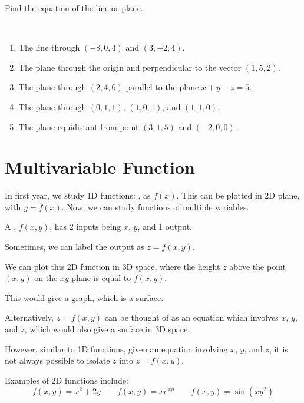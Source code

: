 \documentclass[11pt,fleqn]{book} %
\begin{document}
\begin{exercise}
    Find the equation of the line or plane.

    {~~~}

    \begin{enumerate}
        \item The line through $(-8, 0, 4)$ and $(3, -2, 4)$.
        \item The plane through the origin and perpendicular to the vector $(1, 5, 2)$.
        \item The plane through $(2, 4, 6)$ parallel to the plane $x + y - z = 5$.
        \item The plane through $(0, 1, 1)$, $(1, 0, 1)$, and $(1, 1, 0)$.
        \item The plane equidistant from point $(3, 1, 5)$ and $(-2, 0, 0)$.
    \end{enumerate}
\end{exercise}

\section{Multivariable Function}

In first year, we study 1D functions: , as $f(x)$. This can be plotted in 2D plane, with $y = f(x)$. Now, we can study functions of multiple variables.

\begin{definition}[2D Function]
    A , $f(x, y)$, has 2 inputs being $x$, $y$, and 1 output.
\end{definition}

Sometimes, we can label the output as $z = f(x, y)$.

We can plot this 2D function in 3D space, where the height $z$ above the point $(x, y)$ on the $xy$-plane is equal to $f(x, y)$.

This would give a graph, which is a surface.

Alternatively, $z = f(x, y)$ can be thought of as an equation which involves $x$, $y$, and $z$, which would also give a surface in 3D space.

However, similar to 1D functions, given an equation involving $x$, $y$, and $z$, it is not always possible to isolate $z$ into $z = f(x, y)$.

Examples of 2D functions include: $$f(x, y) = x^2 + 2y \qquad f(x, y) = xe^{xy} \qquad f(x, y) = \sin(xy^2)$$
\end{document}
